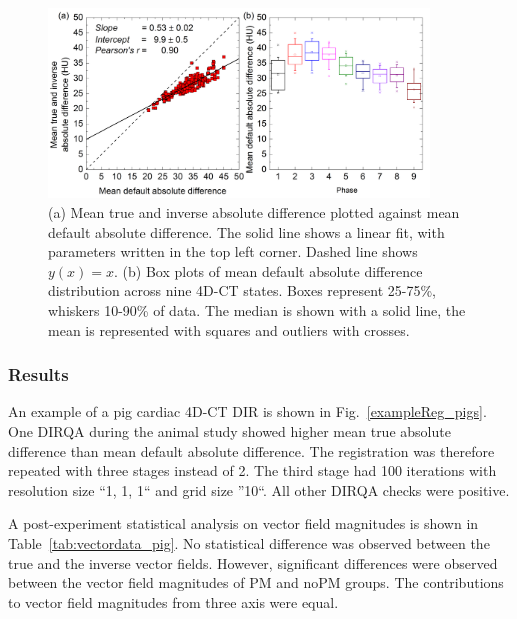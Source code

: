 \begin{figure}[H]
	\begin{center}		
		\includegraphics[width=0.9\textwidth]{./Vmm/Images/AbsDiff_pigs.png}
		\caption{(a) Mean true and inverse absolute difference plotted against mean default absolute difference. The solid line shows a linear fit, with parameters
		written in the top left corner. Dashed line shows $y(x)=x$. (b) Box plots of mean default absolute difference distribution across nine 4D-CT states. Boxes represent 25-75\%, whiskers 10-90\%
		of data. The median is shown with a solid line, the mean is represented with squares and outliers with crosses.}
		\label{absDiff_pigs}
	\end{center}
\end{figure}

\subsubsection{Results}

An example of a pig cardiac 4D-CT DIR is shown in Fig.~\ref{exampleReg_pigs}. One DIRQA during the animal study showed higher mean true absolute difference than mean default absolute difference. The registration
was therefore repeated with three stages instead of 2. The third stage had 100 iterations with resolution size ``1, 1, 1`` and grid size ''10``. All other DIRQA checks were positive.

A post-experiment statistical analysis on vector field magnitudes is shown in Table~\ref{tab:vectordata_pig}. No statistical difference was
observed between the true and the inverse vector fields. However, significant differences were observed between the vector field magnitudes of PM and noPM groups. The contributions to vector field magnitudes from three axis were equal. 


